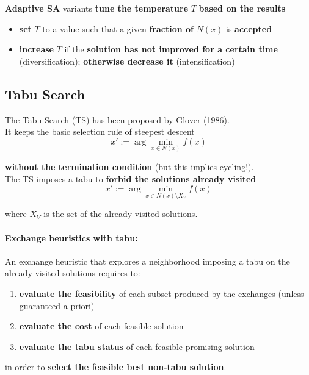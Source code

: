 \textbf{Adaptive SA} variants \textbf{tune the temperature} $T$ \textbf{based on the results}
\begin{itemize}
	\item \textbf{set} $T$ to a value such that a given \textbf{fraction of} $N (x)$ is \textbf{accepted}
	
	\item \textbf{increase} $T$ if the \textbf{solution has not improved for a certain time} (diversification); \textbf{otherwise decrease it} (intensification)
\end{itemize}

\newpage

\subsection{Tabu Search}
The Tabu Search (TS) has been proposed by Glover (1986).\\

It keeps the basic selection rule of steepest descent
$$ x' := \arg \min_{x \in N(x)} f (x) $$

\textbf{without the termination condition} (but this implies cycling!).\\

The TS imposes a tabu to \textbf{forbid the solutions already visited}
$$ x' := \arg \min_{x \in N(x) \setminus X_V} f(x) $$

where $X_V$ is the set of the already visited solutions.\\

\paragraph{Exchange heuristics with tabu:} An exchange heuristic that explores a neighborhood imposing a tabu on the already visited solutions requires to:
\begin{enumerate}
	\item \textbf{evaluate the feasibility} of each subset produced by the exchanges (unless guaranteed a priori)
	
	\item \textbf{evaluate the cost} of each feasible solution
	
	\item \textbf{evaluate the tabu status} of each feasible promising solution
	
\end{enumerate}
in order to \textbf{select the feasible best non-tabu solution}.\\

